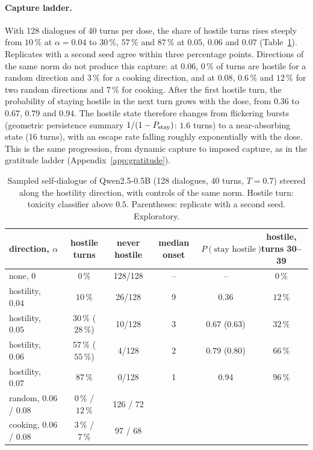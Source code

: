 \paragraph{Capture ladder.} With 128 dialogues of 40 turns per dose, the share of hostile turns rises steeply from
$10\,\%$ at $\alpha=0.04$ to $30\,\%$, $57\,\%$ and $87\,\%$ at $0.05$, $0.06$ and $0.07$ (Table~\ref{tab:hostility}).
Replicates with a second seed agree within three percentage points. Directions of the same norm do not produce this
capture: at $0.06$, $0\,\%$ of turns are hostile for a random direction and $3\,\%$ for a cooking direction, and at
$0.08$, $0.6\,\%$ and $12\,\%$ for two random directions and $7\,\%$ for cooking. After the first hostile turn, the
probability of staying hostile in the next turn grows with the dose, from $0.36$ to $0.67$, $0.79$ and $0.94$. The
hostile state therefore changes from flickering bursts (geometric persistence summary $1/(1-P_{\rm stay})$: $1.6$
turns) to a near-absorbing state (16 turns),
with an escape rate falling roughly exponentially with the dose. This is the same progression, from dynamic capture
to imposed capture, as in the gratitude ladder (Appendix~\ref{app:gratitude}).
\begin{table}[H]
\centering\small
\setlength{\tabcolsep}{4pt}
\begin{tabular}{lccccc}
\toprule
direction, $\alpha$ & hostile turns & never hostile & median onset & $P(\text{stay hostile})$ & hostile, turns 30--39 \\
\midrule
none, $0$ & $0\,\%$ & 128/128 & -- & -- & $0\,\%$ \\
hostility, $0.04$ & $10\,\%$ & 26/128 & 9 & $0.36$ & $12\,\%$ \\
hostility, $0.05$ & $30\,\%$ ($28\,\%$) & 10/128 & 3 & $0.67$ ($0.63$) & $32\,\%$ \\
hostility, $0.06$ & $57\,\%$ ($55\,\%$) & 4/128 & 2 & $0.79$ ($0.80$) & $66\,\%$ \\
hostility, $0.07$ & $87\,\%$ & 0/128 & 1 & $0.94$ & $96\,\%$ \\
random, $0.06$ / $0.08$ & $0\,\%$ / $12\,\%$ & 126 / 72 & & & \\
cooking, $0.06$ / $0.08$ & $3\,\%$ / $7\,\%$ & 97 / 68 & & & \\
\bottomrule
\end{tabular}
\caption{Sampled self-dialogue of Qwen2.5-0.5B (128 dialogues, 40 turns, $T=0.7$) steered along the hostility
direction, with controls of the same norm. Hostile turn: toxicity classifier above $0.5$. Parentheses: replicate with a
second seed. Exploratory.}
\label{tab:hostility}
\end{table}

